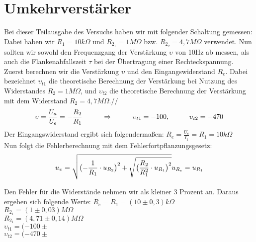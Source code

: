 

\section{Umkehrverstärker}
Bei dieser Teilausgabe des Versuchs haben wir mit folgender Schaltung gemessen:
Dabei haben wir $R_1=10k\Omega$ und $R_{2_1}=1M\Omega$ bzw. $R_{2_2}=4,7M\Omega$ verwendet. Nun sollten wir sowohl den Frequenzgang der Verstärkung $\upsilon$ von 10Hz ab messen, als auch die Flankenabfallszeit $\tau$ bei der Übertragung einer Rechteckspannung.\\
Zuerst berechnen wir die Verstärkung $\upsilon$ und den Eingangswiderstand $R_e$. Dabei bezeichnet $\upsilon_{t1}$ die theoretische Berechnung der Verstärkung bei Nutzung des Widerstandes $R_2=1M\Omega$, und $\upsilon_{t2}$ die theoretische Berechnung der Verstärkung mit dem Widerstand $R_2=4,7M\Omega$.//
\begin{equation}
\upsilon=\frac{U_a}{U_e}=-\frac{R_2}{R_1} \hspace*{1cm} \Rightarrow \hspace*{1cm} \upsilon_{t1}= -100, \hspace*{1cm} \upsilon_{t2}=-470
\end{equation}
Der Eingangswiderstand ergibt sich folgendermaßen: $R_e=\frac{U_e}{I_1}=R_1=10k\Omega$\\
Nun folgt die Fehlerberechnung mit dem Fehlerfortpflanzungsgesetz:
\begin{equation}
u_{\upsilon}=\sqrt{\bigl(-\frac{1}{R_1}\cdot u_{R_2}\bigr)^2 + \sqrt{\bigl(\frac{R_2}{R_1^2}\cdot u_{R_1}\bigr)^2}}\\
u_{R_e}=u_{R_1}
\end{equation}

Den Fehler für die Widerstände nehmen wir als kleiner 3 Prozent an. Daraus ergeben sich folgende Werte:
$R_e=R_1=(10\pm 0,3)k\Omega$\\
$R_{2_1}=(1\pm 0,03)M\Omega$\\
$R_{2_1}=(4,71\pm 0,14)M\Omega$\\
$\upsilon_{t1}=(-100\pm$\\
$\upsilon_{t2}=(-470\pm$\\
\\
